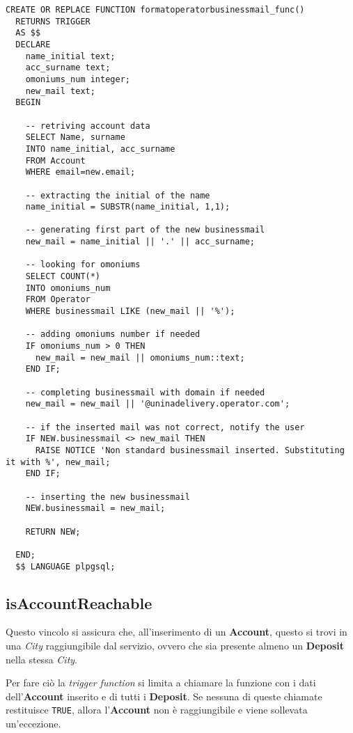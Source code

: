 \begin{lstlisting}[caption={Funzione per il vincolo \textbf{formatOperatorBusinessmail}}]
  CREATE OR REPLACE FUNCTION formatoperatorbusinessmail_func()
  RETURNS TRIGGER
  AS $$
  DECLARE
    name_initial text;
    acc_surname text;
    omoniums_num integer;
    new_mail text;
  BEGIN

    -- retriving account data
    SELECT Name, surname
    INTO name_initial, acc_surname
    FROM Account
    WHERE email=new.email;

    -- extracting the initial of the name
    name_initial = SUBSTR(name_initial, 1,1);

    -- generating first part of the new businessmail
    new_mail = name_initial || '.' || acc_surname;

    -- looking for omoniums
    SELECT COUNT(*)
    INTO omoniums_num
    FROM Operator
    WHERE businessmail LIKE (new_mail || '%');

    -- adding omoniums number if needed
    IF omoniums_num > 0 THEN
      new_mail = new_mail || omoniums_num::text;
    END IF;

    -- completing businessmail with domain if needed
    new_mail = new_mail || '@uninadelivery.operator.com';

    -- if the inserted mail was not correct, notify the user
    IF NEW.businessmail <> new_mail THEN
      RAISE NOTICE 'Non standard businessmail inserted. Substituting it with %', new_mail;
    END IF;

    -- inserting the new businessmail
    NEW.businessmail = new_mail;

    RETURN NEW;

  END;
  $$ LANGUAGE plpgsql;
\end{lstlisting}

\subsection{\textbf{isAccountReachable}}

Questo vincolo si assicura che, all'inserimento di un \textbf{Account}, questo si trovi in una \textit{City} raggiungibile dal servizio, ovvero che sia presente almeno un \textbf{Deposit} nella stessa \textit{City}.

Per fare ciò la \textit{trigger function} si limita a chiamare la funzione  con i dati dell'\textbf{Account} inserito e di tutti i \textbf{Deposit}. Se nessuna di queste chiamate restituisce \lstinline{TRUE}, allora l'\textbf{Account} non è raggiungibile e viene sollevata un'eccezione.

